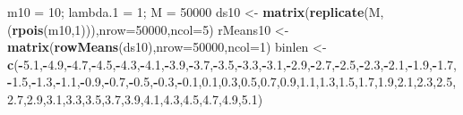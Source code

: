 \documentclass[
]{article}
\newenvironment{Shaded}{\begin{snugshade}}{\end{snugshade}}
\newcommand{\DataTypeTok}[1]{\textcolor[rgb]{0.13,0.29,0.53}{#1}}
\newcommand{\DecValTok}[1]{\textcolor[rgb]{0.00,0.00,0.81}{#1}}
\newcommand{\FloatTok}[1]{\textcolor[rgb]{0.00,0.00,0.81}{#1}}
\newcommand{\KeywordTok}[1]{\textcolor[rgb]{0.13,0.29,0.53}{\textbf{#1}}}
\newcommand{\NormalTok}[1]{#1}
\newcommand{\OperatorTok}[1]{\textcolor[rgb]{0.81,0.36,0.00}{\textbf{#1}}}
\newcommand{\StringTok}[1]{\textcolor[rgb]{0.31,0.60,0.02}{#1}}
\begin{document}
\begin{Shaded}
\begin{Highlighting}[]
\NormalTok{m10 =}\StringTok{ }\DecValTok{10}\NormalTok{; lambda}\FloatTok{.1}\NormalTok{ =}\StringTok{ }\DecValTok{1}\NormalTok{; M =}\StringTok{ }\DecValTok{50000}
\NormalTok{ds10 <-}\StringTok{ }\KeywordTok{matrix}\NormalTok{(}\KeywordTok{replicate}\NormalTok{(M,(}\KeywordTok{rpois}\NormalTok{(m10,}\DecValTok{1}\NormalTok{))),}\DataTypeTok{nrow=}\DecValTok{50000}\NormalTok{,}\DataTypeTok{ncol=}\DecValTok{5}\NormalTok{)}
\NormalTok{rMeans10 <-}\StringTok{ }\KeywordTok{matrix}\NormalTok{(}\KeywordTok{rowMeans}\NormalTok{(ds10),}\DataTypeTok{nrow=}\DecValTok{50000}\NormalTok{,}\DataTypeTok{ncol=}\DecValTok{1}\NormalTok{)}
\NormalTok{binlen <-}\StringTok{ }\KeywordTok{c}\NormalTok{(}\OperatorTok{-}\FloatTok{5.1}\NormalTok{,}\OperatorTok{-}\FloatTok{4.9}\NormalTok{,}\OperatorTok{-}\FloatTok{4.7}\NormalTok{,}\OperatorTok{-}\FloatTok{4.5}\NormalTok{,}\OperatorTok{-}\FloatTok{4.3}\NormalTok{,}\OperatorTok{-}\FloatTok{4.1}\NormalTok{,}\OperatorTok{-}\FloatTok{3.9}\NormalTok{,}\OperatorTok{-}\FloatTok{3.7}\NormalTok{,}\OperatorTok{-}\FloatTok{3.5}\NormalTok{,}\OperatorTok{-}\FloatTok{3.3}\NormalTok{,}\OperatorTok{-}\FloatTok{3.1}\NormalTok{,}\OperatorTok{-}\FloatTok{2.9}\NormalTok{,}\OperatorTok{-}\FloatTok{2.7}\NormalTok{,}\OperatorTok{-}\FloatTok{2.5}\NormalTok{,}\OperatorTok{-}\FloatTok{2.3}\NormalTok{,}\OperatorTok{-}\FloatTok{2.1}\NormalTok{,}\OperatorTok{-}\FloatTok{1.9}\NormalTok{,}\OperatorTok{-}\FloatTok{1.7}\NormalTok{,}\OperatorTok{-}\FloatTok{1.5}\NormalTok{,}\OperatorTok{-}\FloatTok{1.3}\NormalTok{,}\OperatorTok{-}\FloatTok{1.1}\NormalTok{,}\OperatorTok{-}\FloatTok{0.9}\NormalTok{,}\OperatorTok{-}\FloatTok{0.7}\NormalTok{,}\OperatorTok{-}\FloatTok{0.5}\NormalTok{,}\OperatorTok{-}\FloatTok{0.3}\NormalTok{,}\OperatorTok{-}\FloatTok{0.1}\NormalTok{,}\FloatTok{0.1}\NormalTok{,}\FloatTok{0.3}\NormalTok{,}\FloatTok{0.5}\NormalTok{,}\FloatTok{0.7}\NormalTok{,}\FloatTok{0.9}\NormalTok{,}\FloatTok{1.1}\NormalTok{,}\FloatTok{1.3}\NormalTok{,}\FloatTok{1.5}\NormalTok{,}\FloatTok{1.7}\NormalTok{,}\FloatTok{1.9}\NormalTok{,}\FloatTok{2.1}\NormalTok{,}\FloatTok{2.3}\NormalTok{,}\FloatTok{2.5}\NormalTok{,}\FloatTok{2.7}\NormalTok{,}\FloatTok{2.9}\NormalTok{,}\FloatTok{3.1}\NormalTok{,}\FloatTok{3.3}\NormalTok{,}\FloatTok{3.5}\NormalTok{,}\FloatTok{3.7}\NormalTok{,}\FloatTok{3.9}\NormalTok{,}\FloatTok{4.1}\NormalTok{,}\FloatTok{4.3}\NormalTok{,}\FloatTok{4.5}\NormalTok{,}\FloatTok{4.7}\NormalTok{,}\FloatTok{4.9}\NormalTok{,}\FloatTok{5.1}\NormalTok{)}

\end{Highlighting}
\end{Shaded}
\end{document}
